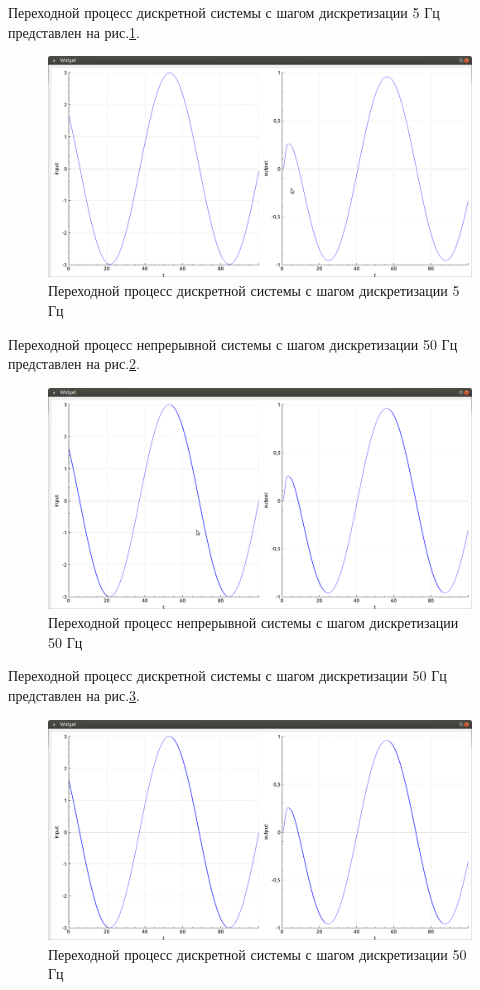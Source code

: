 \documentclass[14pt,a4paper]{extreport}
\begin{document}
Переходной процесс дискретной системы с шагом дискретизации 
5 Гц представлен на рис.\ref{fig:dis_5hz}.
\begin{figure}[H]
    \centering
    \includegraphics[width=160mm]{img/dis_5hz.png}
    \caption{Переходной процесс дискретной системы 
    с шагом дискретизации 5 Гц}
    \label{fig:dis_5hz}
\end{figure}

Переходной процесс непрерывной системы с шагом дискретизации 
50 Гц представлен на рис.\ref{fig:con_50hz}.
\begin{figure}[H]
    \centering
    \includegraphics[width=160mm]{img/con_50hz.png}
    \caption{Переходной процесс непрерывной системы с шагом дискретизации 50 Гц}
    \label{fig:con_50hz}
\end{figure}

Переходной процесс дискретной системы с шагом дискретизации 
50 Гц представлен на рис.\ref{fig:dis_50hz}.

\begin{figure}[H]
    \centering
    \includegraphics[width=160mm]{img/dis_50hz.png}
    \caption{Переходной процесс дискретной системы 
    с шагом дискретизации 50 Гц}
    \label{fig:dis_50hz}
\end{figure}
\end{document}

